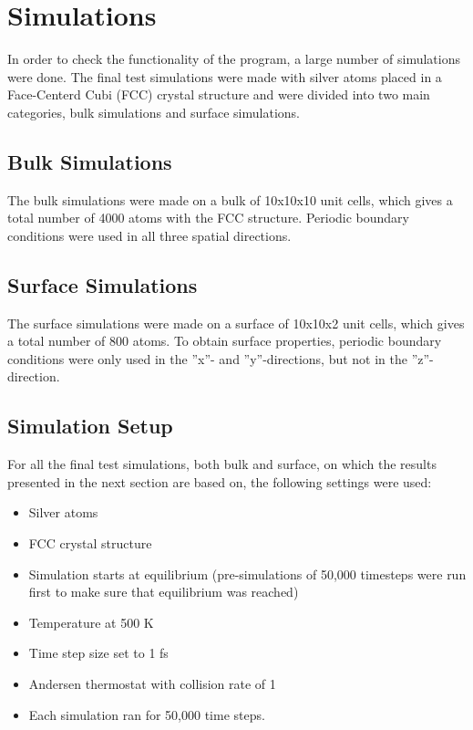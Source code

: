 \section{Simulations} 
In order to check the functionality of the program, a large number of simulations were done. The final test simulations were made with silver atoms placed in a Face-Centerd Cubi (FCC) crystal structure and were divided into two main categories, bulk simulations and surface simulations.

\subsection{Bulk Simulations}
The bulk simulations were made on a bulk of 10x10x10 unit cells, which gives a total number of 4000 atoms with the FCC structure. Periodic boundary conditions were used in all three spatial directions. 

\subsection{Surface Simulations}
The surface simulations were made on a surface of 10x10x2 unit cells, which gives a total number of 800 atoms. To obtain surface properties, periodic boundary conditions were only used in the ''x''- and ''y''-directions, but not in the ''z''-direction.

\subsection{Simulation Setup}
For all the final test simulations, both bulk and surface, on which the results presented in the next section are based on, the following settings were used:
\begin{itemize}
	\item Silver atoms
	\item FCC crystal structure
	\item Simulation starts at equilibrium (pre-simulations of 50,000 timesteps were run first to make sure that equilibrium was reached)
	\item Temperature at 500 K
	\item Time step size set to 1 fs
	\item Andersen thermostat with collision rate of 1%
	\item Each simulation ran for 50,000 time steps.
\end{itemize}
